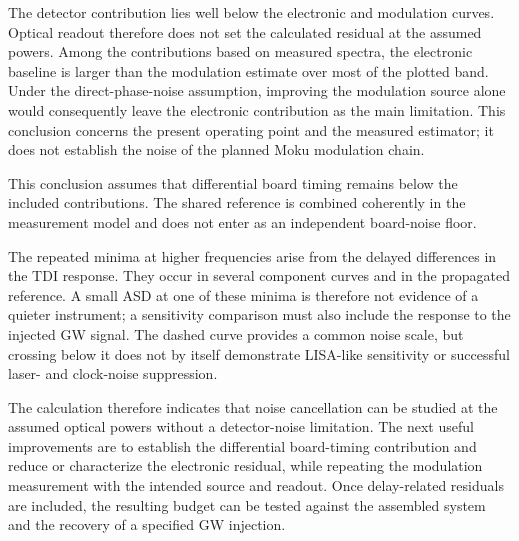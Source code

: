 The detector contribution lies well below the electronic and modulation curves. Optical readout therefore does not set the calculated residual at the assumed powers. Among the contributions based on measured spectra, the electronic baseline is larger than the modulation estimate over most of the plotted band. Under the direct-phase-noise assumption, improving the modulation source alone would consequently leave the electronic contribution as the main limitation. This conclusion concerns the present operating point and the measured estimator; it does not establish the noise of the planned Moku modulation chain.

This conclusion assumes that differential board timing remains below the included contributions. The shared reference is combined coherently in the measurement model and does not enter as an independent board-noise floor.

The repeated minima at higher frequencies arise from the delayed differences in the TDI response. They occur in several component curves and in the propagated reference. A small ASD at one of these minima is therefore not evidence of a quieter instrument; a sensitivity comparison must also include the response to the injected GW signal. The dashed curve provides a common noise scale, but crossing below it does not by itself demonstrate LISA-like sensitivity or successful laser- and clock-noise suppression.

The calculation therefore indicates that noise cancellation can be studied at the assumed optical powers without a detector-noise limitation. The next useful improvements are to establish the differential board-timing contribution and reduce or characterize the electronic residual, while repeating the modulation measurement with the intended source and readout. Once delay-related residuals are included, the resulting budget can be tested against the assembled system and the recovery of a specified GW injection.
